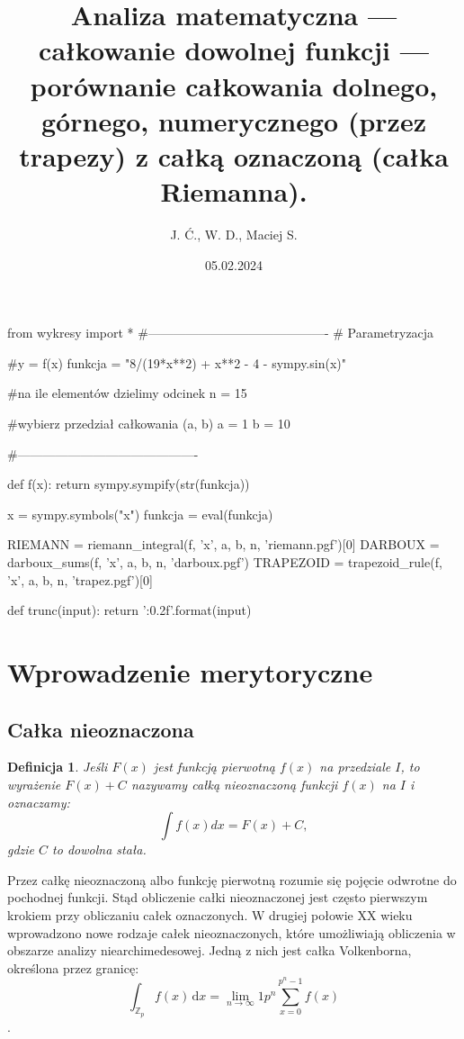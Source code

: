 \documentclass[a4paper]{article}
\title{\textbf{Analiza matematyczna --- całkowanie dowolnej funkcji --- porównanie całkowania dolnego, górnego, numerycznego (przez trapezy) z całką oznaczoną (całka Riemanna).}}
\author{J. Ć., W. D., Maciej S.}
\date{05.02.2024}
\begin{document}
\maketitle
\vspace{3cm}
\newtheorem{definition}{Definicja}

\begin{pycode}
from wykresy import *
#-------------------------------------------
#	Parametryzacja

#y = f(x)
funkcja = "8/(19*x**2) + x**2 - 4 - sympy.sin(x)"
	
#na ile elementów dzielimy odcinek
n = 15

#wybierz przedział całkowania (a, b)
a = 1
b = 10
	
#-------------------------------------------

def f(x):
	return sympy.sympify(str(funkcja))

x = sympy.symbols("x")
funkcja = eval(funkcja)

RIEMANN = riemann_integral(f, 'x', a, b, n, 'riemann.pgf')[0]
DARBOUX = darboux_sums(f, 'x', a, b, n, 'darboux.pgf')
TRAPEZOID = trapezoid_rule(f, 'x', a, b, n, 'trapez.pgf')[0]

def trunc(input):
	return '{:0.2f}'.format(input)

\end{pycode}

\section{Wprowadzenie merytoryczne}
\subsection{Całka nieoznaczona}
\begin{definition}
	Jeśli $F(x)$ jest funkcją pierwotną $f(x)$ na przedziale $I$, to wyrażenie $F(x) + C$ nazywamy całką nieoznaczoną funkcji $f(x)$ na $I$ i oznaczamy: $$\int f(x)dx = F(x) + C,$$ gdzie $C$ to dowolna stała.
\end{definition}
Przez całkę nieoznaczoną albo funkcję pierwotną rozumie się pojęcie odwrotne do pochodnej funkcji. Stąd obliczenie całki nieoznaczonej jest często pierwszym krokiem przy obliczaniu całek oznaczonych. W drugiej połowie XX wieku wprowadzono nowe rodzaje całek nieoznaczonych, które umożliwiają obliczenia w obszarze analizy niearchimedesowej. Jedną z nich jest całka Volkenborna, określona przez granicę:
{$$\displaystyle \int _{\mathbb {Z} _{p}}f(x)\,\mathrm {d} x=\lim _{n\to \infty }{ {1}{p^{n}}}\sum _{x=0}^{p^{n}-1}f(x)$$}.
\end{document}
